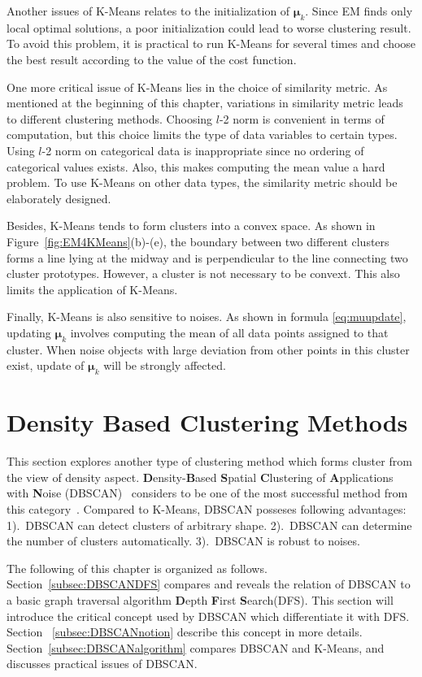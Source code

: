 Another issues of K-Means relates to the initialization of \(\boldsymbol{\mu}_k\). Since EM finds only local optimal solutions, a poor initialization could lead to worse clustering result. To avoid this problem, it is practical to run K-Means for several times and choose the best result according to the value of the cost function.

One more critical issue of K-Means lies in the choice of similarity metric. As mentioned at the beginning of this chapter, variations in similarity metric leads to different clustering methods. Choosing \(l\)-2 norm is convenient in terms of computation, but this choice limits the type of data variables to certain types. Using \(l\)-2 norm on categorical data is inappropriate since no ordering of categorical values exists. Also, this makes computing the mean value a hard problem. To use K-Means on other data types, the similarity metric should be elaborately designed. 

Besides, K-Means tends to form clusters into a convex space. As shown in Figure~\ref{fig:EM4KMeans}(b)-(e), the boundary between two different clusters forms a line lying at the midway and is perpendicular to the line connecting two cluster prototypes. However, a cluster is not necessary to be convext. This also limits the application of K-Means.

Finally, K-Means is also sensitive to noises. As shown in formula \ref{eq:muupdate}, updating \(\boldsymbol{\mu}_k\) involves computing the mean of all data points assigned to that cluster. When noise objects with large deviation from other points in this cluster exist, update of \(\boldsymbol{\mu}_k\) will be strongly affected. 

\section{Density Based Clustering Methods}
This section explores another type of clustering method which forms cluster from the view of density aspect. \textbf{D}ensity-\textbf{B}ased \textbf{S}patial \textbf{C}lustering of \textbf{A}pplications with \textbf{N}oise (DBSCAN)~\cite{ester1996density} considers to be one of the most successful method from this category~\cite{2014timeaward}. Compared to K-Means, DBSCAN posseses following advantages: 1).\ DBSCAN can detect clusters of arbitrary shape. 2).\ DBSCAN can determine the number of clusters automatically. 3).\ DBSCAN is robust to noises. 

The following of this chapter is organized as follows. Section~\ref{subsec:DBSCANDFS} compares and reveals the relation of DBSCAN to a basic graph traversal algorithm \textbf{D}epth \textbf{F}irst \textbf{S}earch(DFS). This section will introduce the critical concept used by DBSCAN which differentiate it with DFS. Section ~\ref{subsec:DBSCANnotion} describe this concept in more details. Section~\ref{subsec:DBSCANalgorithm} compares DBSCAN and K-Means, and discusses practical issues of DBSCAN.

